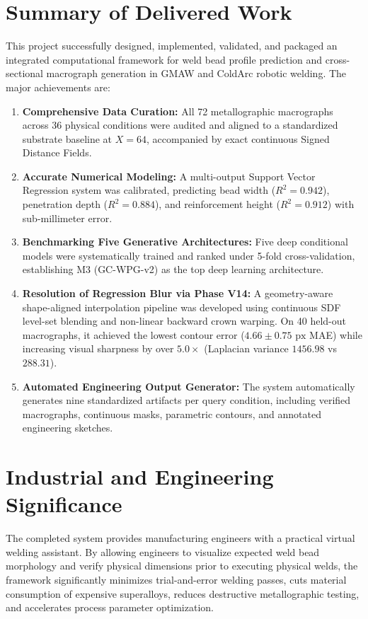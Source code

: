 \documentclass[12pt,a4paper,oneside]{report}
\begin{document}
\section{Summary of Delivered Work}
This project successfully designed, implemented, validated, and packaged an integrated computational framework for weld bead profile prediction and cross-sectional macrograph generation in GMAW and ColdArc robotic welding. The major achievements are:
\begin{enumerate}
    \item \textbf{Comprehensive Data Curation:} All 72 metallographic macrographs across 36 physical conditions were audited and aligned to a standardized substrate baseline at $X=64$, accompanied by exact continuous Signed Distance Fields.
    \item \textbf{Accurate Numerical Modeling:} A multi-output Support Vector Regression system was calibrated, predicting bead width ($R^2=0.942$), penetration depth ($R^2=0.884$), and reinforcement height ($R^2=0.912$) with sub-millimeter error.
    \item \textbf{Benchmarking Five Generative Architectures:} Five deep conditional models were systematically trained and ranked under 5-fold cross-validation, establishing M3 (GC-WPG-v2) as the top deep learning architecture.
    \item \textbf{Resolution of Regression Blur via Phase V14:} A geometry-aware shape-aligned interpolation pipeline was developed using continuous SDF level-set blending and non-linear backward crown warping. On 40 held-out macrographs, it achieved the lowest contour error ($4.66 \pm 0.75\text{ px}$ MAE) while increasing visual sharpness by over $5.0\times$ (Laplacian variance $1456.98$ vs $288.31$).
    \item \textbf{Automated Engineering Output Generator:} The system automatically generates nine standardized artifacts per query condition, including verified macrographs, continuous masks, parametric contours, and annotated engineering sketches.
\end{enumerate}

\section{Industrial and Engineering Significance}
The completed system provides manufacturing engineers with a practical virtual welding assistant. By allowing engineers to visualize expected weld bead morphology and verify physical dimensions prior to executing physical welds, the framework significantly minimizes trial-and-error welding passes, cuts material consumption of expensive superalloys, reduces destructive metallographic testing, and accelerates process parameter optimization.
\end{document}
